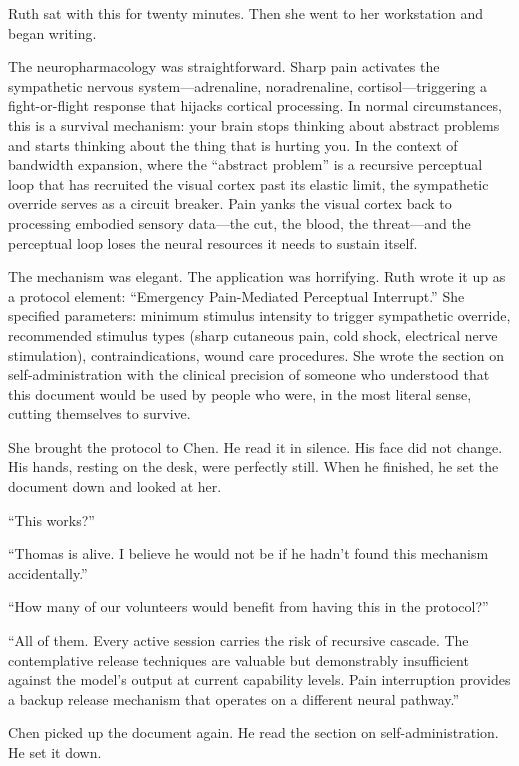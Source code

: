 Ruth sat with this for twenty minutes. Then she went to her workstation and began writing.

The neuropharmacology was straightforward. Sharp pain activates the sympathetic nervous system---adrenaline, noradrenaline, cortisol---triggering a fight-or-flight response that hijacks cortical processing. In normal circumstances, this is a survival mechanism: your brain stops thinking about abstract problems and starts thinking about the thing that is hurting you. In the context of bandwidth expansion, where the ``abstract problem'' is a recursive perceptual loop that has recruited the visual cortex past its elastic limit, the sympathetic override serves as a circuit breaker. Pain yanks the visual cortex back to processing embodied sensory data---the cut, the blood, the threat---and the perceptual loop loses the neural resources it needs to sustain itself.

The mechanism was elegant. The application was horrifying. Ruth wrote it up as a protocol element: ``Emergency Pain-Mediated Perceptual Interrupt.'' She specified parameters: minimum stimulus intensity to trigger sympathetic override, recommended stimulus types (sharp cutaneous pain, cold shock, electrical nerve stimulation), contraindications, wound care procedures. She wrote the section on self-administration with the clinical precision of someone who understood that this document would be used by people who were, in the most literal sense, cutting themselves to survive.

She brought the protocol to Chen. He read it in silence. His face did not change. His hands, resting on the desk, were perfectly still. When he finished, he set the document down and looked at her.

``This works?''

``Thomas is alive. I believe he would not be if he hadn't found this mechanism accidentally.''

``How many of our volunteers would benefit from having this in the protocol?''

``All of them. Every active session carries the risk of recursive cascade. The contemplative release techniques are valuable but demonstrably insufficient against the model's output at current capability levels. Pain interruption provides a backup release mechanism that operates on a different neural pathway.''

Chen picked up the document again. He read the section on self-administration. He set it down.

